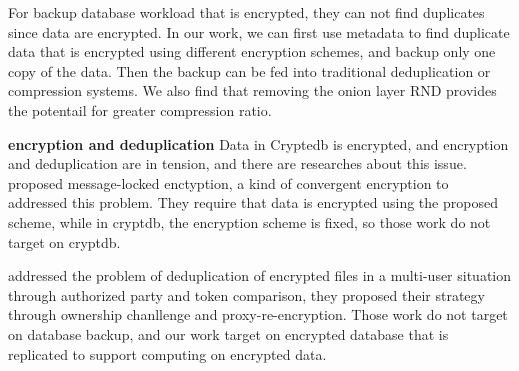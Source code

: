 For backup database workload that is encrypted, they can not find duplicates since data are encrypted. In our work, we can first use metadata to find duplicate data that is encrypted using different encryption schemes, and backup only one copy of the data. Then the backup can be fed into traditional deduplication or compression systems. We also find that removing the onion layer RND provides the potentail for greater compression ratio. 

\textbf{encryption and deduplication} Data in Cryptedb is encrypted, and encryption and deduplication are in tension, and there are researches about this issue.\citep{bellare2013message} \citep{puzio2015perfectdedup} proposed message-locked enctyption, a kind of convergent encryption to addressed this problem. They require that data is encrypted using the proposed scheme, while in cryptdb, the encryption scheme is fixed, so those work do not target on cryptdb.

\citep{yan2016deduplication} addressed the problem of deduplication of encrypted files in a multi-user situation through authorized party and token comparison, they proposed their strategy through ownership chanllenge and proxy-re-encryption. Those work do not target on database backup, and our work target on encrypted database that is replicated to support computing on encrypted data.










